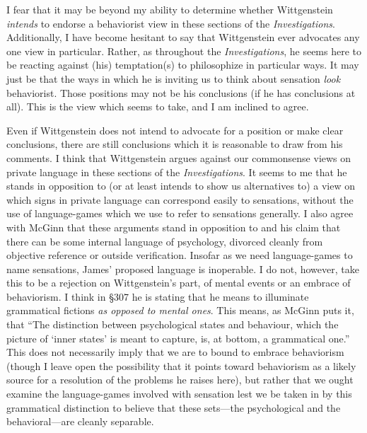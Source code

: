 \documentclass[doc,12pt,apacite,biblatex]{apa6}
\begin{document}
I fear that it may be beyond my ability to determine whether Wittgenstein
\emph{intends} to endorse a behaviorist view in these sections of the
\emph{Investigations}. Additionally, I have become hesitant to say that
Wittgenstein ever advocates any one view in particular.  Rather, as throughout
the \emph{Investigations}, he seems here to be reacting against (his)
temptation(s) to philosophize in particular ways. It may just be that the ways
in which he is inviting us to think about sensation \emph{look} behaviorist.
Those positions may not be his conclusions (if he has conclusions at all). This
is the view which  seems to take, and I am inclined to agree.

Even if Wittgenstein does not intend to advocate for a position or make clear
conclusions, there are still conclusions which it is reasonable to draw from
his comments. I think that Wittgenstein argues against our commonsense views on
private language in these sections of the \emph{Investigations}. It seems to me
that he stands in opposition to (or at least intends to show us alternatives
to) a view on which signs in private language can correspond easily to
sensations, without the use of language-games which we use to refer to
sensations generally. I also agree with McGinn that these arguments stand in
opposition to  and his claim that there can be some internal
language of psychology, divorced cleanly from objective reference or outside
verification. Insofar as we need language-games to name sensations, James'
proposed language is inoperable. I do not, however, take this to be a rejection
on Wittgenstein's part, of mental events or an embrace of behaviorism. I think
in \S 307 he is stating that he means to illuminate grammatical fictions
\emph{as opposed to mental ones}. This means, as McGinn puts it, that ``The
distinction between psychological states and behaviour, which the picture of
`inner states' is meant to capture, is, at bottom, a grammatical one.'' This
does not necessarily imply that we are to bound to embrace behaviorism (though
I leave open the possibility that it points toward behaviorism as a likely
source for a resolution of the problems he raises here), but rather that we
ought examine the language-games involved with sensation lest we be taken in by
this grammatical distinction to believe that these sets---the psychological and
the behavioral---are cleanly separable.

\end{document}
